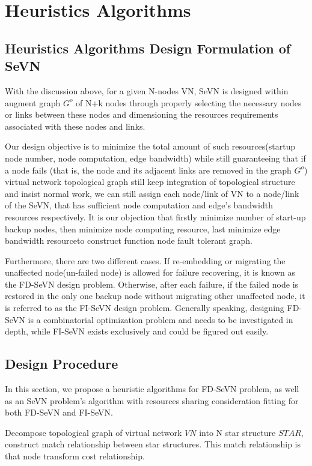 \section{Heuristics Algorithms}
\subsection{Heuristics Algorithms Design Formulation of SeVN }
\label{sub:SeVNDesignFormulation}
With the discussion above, for a given N-nodes VN, SeVN is designed within augment graph $G^o$ of N+k nodes through properly selecting the necessary nodes or links between these nodes and dimensioning the resources requirements associated with these nodes and links.

Our design objective is to minimize the total amount of such resources(startup node number, node computation, edge bandwidth) while still guaranteeing that if a node fails (that is, the node and its adjacent links are removed in the graph $G^o$) virtual network topological graph still keep integration of topological structure and insist normal work, we can still assign each node/link of VN to a node/link of the SeVN, that has sufficient node computation and edge's bandwidth resources respectively. It is our objection that firstly minimize number of start-up backup nodes, then minimize node computing resource, last minimize edge bandwidth resourceto construct function node fault tolerant graph.

Furthermore, there are two different cases. If re-embedding or migrating the unaffected node(un-failed node) is allowed for failure recovering, it is known as the FD-SeVN design problem. Otherwise, after each failure, if the failed node is restored in the only one backup node without migrating other unaffected node, it is referred to as the FI-SeVN design problem. Generally speaking, designing FD-SeVN is a combinatorial optimization problem and needs to be investigated in depth, while FI-SeVN exists exclusively and could be figured out easily.


\subsection{Design Procedure}

In this section, we propose a heuristic algorithms for FD-SeVN problem, as well as an SeVN problem's algorithm with resources sharing consideration fitting for both FD-SeVN and FI-SeVN.

Decompose topological graph of  virtual network $VN$ into N star structure $STAR$, construct match relationship between star structures. This match relationship is that node transform cost relationship.

